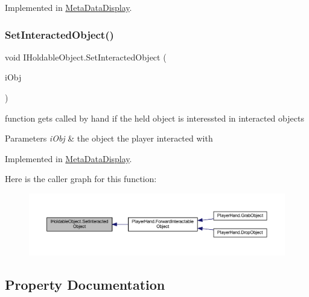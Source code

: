 Implemented in \mbox{\hyperlink{class_meta_data_display_a1ecbc336a25464fc9999120066263e2a}{Meta\+Data\+Display}}.

\mbox{\label{interface_i_holdable_object_aeb32a55273b99d16f9fb5b86f6a73f80}} 
\subsubsection{\texorpdfstring{Set\+Interacted\+Object()}{SetInteractedObject()}}
{\footnotesize\ttfamily void I\+Holdable\+Object.\+Set\+Interacted\+Object (\begin{DoxyParamCaption}\item[{\mbox{\hyperlink{interface_i_interactable}{I\+Interactable}}}]{i\+Obj }\end{DoxyParamCaption})}



function get\textquotesingle{}s called by hand if the held object is interessted in interacted objects 


\begin{DoxyParams}{Parameters}
{\em i\+Obj} & the object the player interacted with\\
\hline
\end{DoxyParams}


Implemented in \mbox{\hyperlink{class_meta_data_display_a29b7b1ec6193b73606dc7da89c387529}{Meta\+Data\+Display}}.

Here is the caller graph for this function\+:\nopagebreak
\begin{figure}[H]
\begin{center}
\leavevmode
\includegraphics[width=350pt]{interface_i_holdable_object_aeb32a55273b99d16f9fb5b86f6a73f80_icgraph}
\end{center}
\end{figure}


\subsection{Property Documentation}
\mbox{\label{interface_i_holdable_object_a99b6760e4f5c71c79d8b084673a3818b}} 
